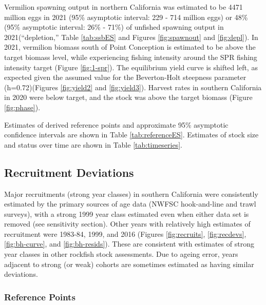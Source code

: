 \documentclass[11pt,
  english,
]{article}
\begin{document}
Vermilion spawning output in northern California was estimated to be 4471 million eggs in 2021 (95\% asymptotic interval: 229 - 714 million eggs) or 48\% (95\% asymptotic interval: 26\% - 71\%) of unfished spawning output in 2021(``depletion,'' Table \ref{tab:ssbES} and Figures \ref{fig:spawnout} and \ref{fig:depl}). In 2021, vermilion biomass south of Point Conception is estimated to be above the target biomass level, while experiencing fishing intensity around the SPR fishing intensity target (Figure \ref{fig:1-spr}). The equilibrium yield curve is shifted left, as expected given the assumed value for the Beverton-Holt steepness parameter (h=0.72)(Figures \ref{fig:yield2} and \ref{fig:yield3}). Harvest rates in southern California in 2020 were below target, and the stock was above the target biomass (Figure \ref{fig:phase}).

Estimates of derived reference points and approximate 95\% asymptotic confidence intervals are shown in Table \ref{tab:referenceES}. Estimates of stock size and status over time are shown in Table \ref{tab:timeseries}.


\hypertarget{recruitment-deviations}{%
\subsection{Recruitment Deviations}\label{recruitment-deviations}}

\leavevmode\tagmcend\tagstructend

Major recruitments (strong year classes) in southern California were consistently estimated by the primary sources of age data (NWFSC hook-and-line and trawl surveys), with a strong 1999 year class estimated even when either data set is removed (see sensitivity section). Other years with relatively high estimates of recruitment were 1983-84, 1999, and 2016 (Figures \ref{fig:recruits}, \ref{fig:recdevs}, \ref{fig:bh-curve}, and \ref{fig:bh-resids}). These are consistent with estimates of strong year classes in other rockfish stock assessments. Due to ageing error, years adjacent to strong (or weak) cohorts are sometimes estimated as having similar deviations.


\hypertarget{reference-points-1}{%
\subsubsection{Reference Points}\label{reference-points-1}}
\end{document}
